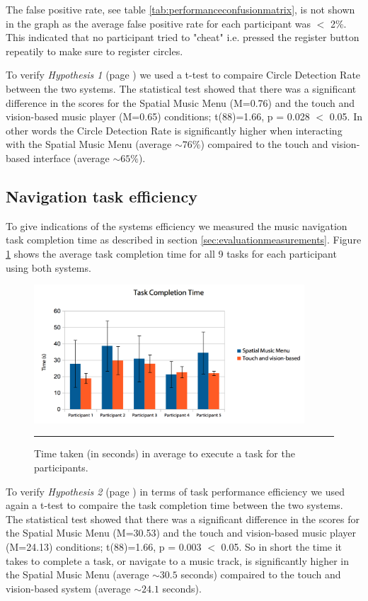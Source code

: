 The false positive rate, see table \ref{tab:performanceconfusionmatrix}, is not shown in the graph as the average false positive rate for each participant was $<$ 2\%. This indicated that no participant tried to "cheat" i.e. pressed the register button repeatily to make sure to register circles.

To verify \textit{Hypothesis 1} (page \pageref{sec:evaluationhypothesis}) we used a t-test to compaire Circle Detection Rate between the two systems. The statistical test showed that there was a significant difference in the scores for the Spatial Music Menu (M=0.76) and the touch and vision-based music player (M=0.65) conditions; t(88)=1.66, p = 0.028 $<$ 0.05. In other words the Circle Detection Rate is significantly higher when interacting with the Spatial Music Menu (average $\sim 76\%$) compaired to the touch and vision-based interface (average $\sim 65\%$).

\subsection{Navigation task efficiency}
To give indications of the systems efficiency we measured the music navigation task completion time as described in section \ref{sec:evaluationmeasurements}. Figure \ref{fig:resultstasktime} shows the average task completion time for all 9 tasks for each participant using both systems.

\begin{figure}[h]
	\centering
		\includegraphics[width=0.9\textwidth,height=\textheight,keepaspectratio]{./Figures/results_tasktime.png}
		\rule{35em}{1pt}
	\caption[Results task time]{Time taken (in seconds) in average to execute a task for the participants.}
	\label{fig:resultstasktime}
\end{figure}

To verify \textit{Hypothesis 2} (page \pageref{sec:evaluationhypothesis}) in terms of task performance efficiency we used again a t-test to compaire the task completion time between the two systems. The statistical test showed that there was a significant difference in the scores for the Spatial Music Menu (M=30.53) and the touch and vision-based music player (M=24.13) conditions; t(88)=1.66, p = 0.003 $<$ 0.05. So in short the time it takes to complete a task, or navigate to a music track, is significantly higher in the Spatial Music Menu (average $\sim 30.5$ seconds) compaired to the touch and vision-based system (average $\sim 24.1$ seconds).

